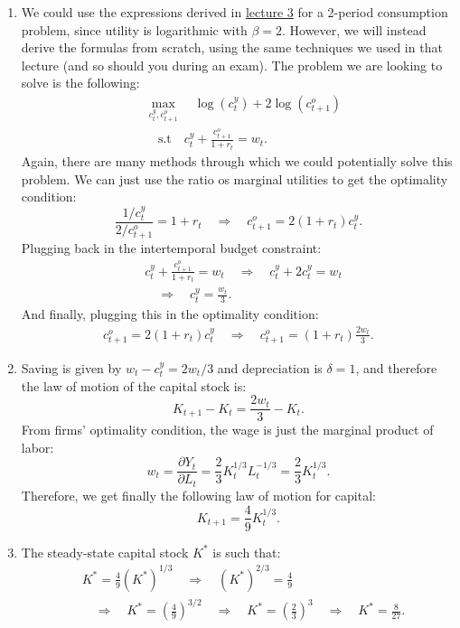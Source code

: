 \documentclass[]{book}
\theoremstyle{definition}
\theoremstyle{definition}
\theoremstyle{definition}
\theoremstyle{remark}
\begin{document}
\begin{enumerate}
\def\labelenumi{\arabic{enumi}.}
\item
  We could use the expressions derived in
  \protect\hyperlink{two-period}{lecture 3} for a 2-period consumption
  problem, since utility is logarithmic with \(\beta = 2\). However, we
  will instead derive the formulas from scratch, using the same
  techniques we used in that lecture (and so should you during an exam).
  The problem we are looking to solve is the following: \[
  \begin{aligned}
  & \max_{c_t^y, c_{t+1}^o} \quad \log(c_t^y) + 2\log(c_{t+1}^o)\\
  & \quad \text{s.t} \quad c_{t}^{y}+\frac{c_{t+1}^{o}}{1+r_t}=w_{t}.
  \end{aligned}
  \] Again, there are many methods through which we could potentially
  solve this problem. We can just use the ratio os marginal utilities to
  get the optimality condition:
  \[\frac{1/c_t^y}{2/c_{t+1}^o}=1+r_t \quad \Rightarrow \quad c_{t+1}^o = 2(1+r_t)c_t^y.\]
  Plugging back in the intertemporal budget constraint: \[
  \begin{aligned}
  &c_{t}^{y}+\frac{c_{t+1}^{o}}{1+r_t}=w_{t} \quad \Rightarrow \quad c_t^y + 2 c_t^y = w_t\\
  &\quad \Rightarrow \quad \boxed{c_t^y = \frac{w_t}{3}}.
  \end{aligned}
  \] And finally, plugging this in the optimality condition: \[
  \begin{aligned}
  c_{t+1}^o = 2(1+r_t)c_t^y \quad \Rightarrow \quad \boxed{c_{t+1}^o = (1+r_t)\frac{2w_t}{3}}.
  \end{aligned}
  \]
\item
  Saving is given by \(w_t - c_t^y = 2w_t/3\) and depreciation is
  \(\delta = 1\), and therefore the law of motion of the capital stock
  is: \[K_{t+1} - K_t = \frac{2w_t}{3}-K_t.\] From firms' optimality
  condition, the wage is just the marginal product of labor:
  \[w_{t}=\frac{\partial Y_{t}}{\partial L_{t}}=\frac{2}{3}K_{t}^{1/3}L_{t}^{-1/3}=\frac{2}{3}K_{t}^{1/3}.\]
  Therefore, we get finally the following law of motion for capital:
  \[K_{t+1} = \frac{4}{9}K_{t}^{1/3}.\]
\item
  The steady-state capital stock \(K^{*}\) is such that: \[
  \begin{aligned}
  & K^{*} = \frac{4}{9}(K^{*})^{1/3} \quad \Rightarrow \quad (K^{*})^{2/3} = \frac{4}{9}\\
  & \quad \Rightarrow \quad K^{*} = \left(\frac{4}{9}\right)^{3/2} \quad \Rightarrow \quad K^{*} = \left(\frac{2}{3}\right)^{3} \quad \Rightarrow \quad \boxed{K^{*} = \frac{8}{27}}.

\end{aligned}\]
\end{enumerate}
\end{document}
